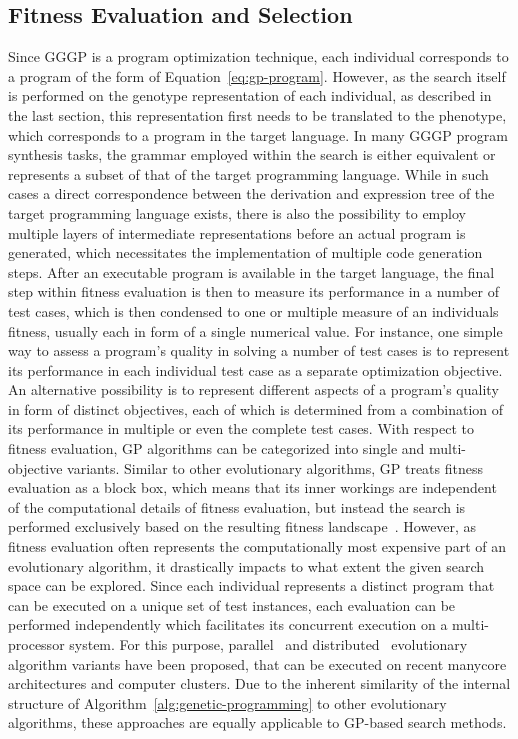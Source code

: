 \subsection{Fitness Evaluation and Selection}
\label{sec:gggp-evaluation-and-selection}
Since GGGP is a program optimization technique, each individual corresponds to a program of the form of Equation~\eqref{eq:gp-program}.
However, as the search itself is performed on the genotype representation of each individual, as described in the last section, this representation first needs to be translated to the phenotype, which corresponds to a program in the target language.
In many GGGP program synthesis tasks, the grammar employed within the search is either equivalent or represents a subset of that of the target programming language.
While in such cases a direct correspondence between the derivation and expression tree of the target programming language exists, there is also the possibility to employ multiple layers of intermediate representations before an actual program is generated, which necessitates the implementation of multiple code generation steps.
After an executable program is available in the target language, the final step within fitness evaluation is then to measure its performance in a number of test cases, which is then condensed to one or multiple measure of an individuals fitness, usually each in form of a single numerical value.
For instance, one simple way to assess a program's quality in solving a number of test cases is to represent its performance in each individual test case as a separate optimization objective.
An alternative possibility is to represent different aspects of a program's quality in form of distinct objectives, each of which is determined from a combination of its performance in multiple or even the complete test cases.
With respect to fitness evaluation, GP algorithms can be categorized into single and multi-objective variants.
Similar to other evolutionary algorithms, GP treats fitness evaluation as a block box, which means that its inner workings are independent of the computational details of fitness evaluation, but instead the search is performed exclusively based on the resulting fitness landscape~\cite{pitzer2012comprehensive}.
However, as fitness evaluation often represents the computationally most expensive part of an evolutionary algorithm, it drastically impacts to what extent the given search space can be explored.
Since each individual represents a distinct program that can be executed on a unique set of test instances, each evaluation can be performed independently which facilitates its concurrent execution on a multi-processor system.
For this purpose, parallel~\cite{sudholt2015parallel} and distributed~\cite{gong2015distributed} evolutionary algorithm variants have been proposed, that can be executed on recent manycore architectures and computer clusters.
Due to the inherent similarity of the internal structure of Algorithm~\ref{alg:genetic-programming} to other evolutionary algorithms, these approaches are equally applicable to GP-based search methods. 


